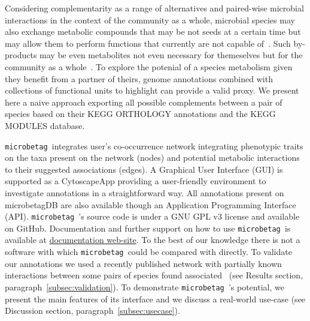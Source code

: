 \documentclass[sn-mathphys,Numbered, lineno]{sn-jnl}  %
\theoremstyle{thmstyleone}%
\theoremstyle{thmstyletwo}%
\theoremstyle{thmstylethree}%
\newcommand{\microbetag}{\texttt{microbetag }}
\begin{document}
    Considering complementarity as a range of alternatives and paired-wise microbial interactions in the context of the community as a whole, microbial species may also exchange metabolic compounds that may be not seeds at a certain time but may allow them to perform functions that currently are not capable of~\cite{mori2016metabolic,zientz2004metabolic}.
    Such by-products may be even metabolites not even necessary for themeselves but for the community as a whole~\cite{kallus2017paradoxes}.
    To explore the potenial of a species metabolism given they benefit from a partner of theirs, genome annotations combined with collections of functional units to highlight can provide a valid proxy.
    We present here a naive approach exporting all possible complements between a pair of species based on their KEGG ORTHOLOGY annotations and the KEGG MODULES database.

    \microbetag integrates user's co-occurrence network integrating phenotypic traits on the taxa present on the network (nodes) and potential metabolic interactions to their suggested associations (edges).
    A Graphical User Interface (GUI) is supported as a CytoscapeApp providing a user-friendly environment to investigate annotations in a straightforward way.
    All annotations present on microbetagDB are also available though an Application Programming Interface (API).
    \microbetag's source code is under a GNU GPL v3 license and available on GitHub. 
    Documentation and further support on how to use \microbetag is available at \href{https://hariszaf.github.io/microbetag/}{documentation web-site}.
    To the best of our knowledge there is not a software with which \microbetag could be compared with directly. 
    To validate our annotations we used a recently published network with partially known interactions between some pairs of species found associated~\cite{hessler2023vitamin} (see Results section, paragraph~\ref{subsec:validation}).    
    To demonstrate \microbetag's potential, we present the main features of its interface and we discuss a real-world use-case (see Discussion section, paragraph~\ref{subsec:usecase}).





\end{document}
